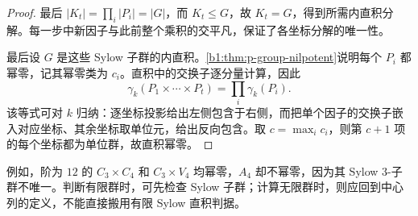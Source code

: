 \begin{proof}
	最后 \(|K_t|=\prod_i|P_i|=|G|\)，而 \(K_t\le G\)，故 \(K_t=G\)，得到所需内直积分解。每一步中新因子与此前整个乘积的交平凡，保证了各坐标分解的唯一性。

	最后设 \(G\) 是这些 Sylow 子群的内直积。\cref{b1:thm:p-group-nilpotent}说明每个 \(P_i\) 都幂零，记其幂零类为 \(c_i\)。直积中的交换子逐分量计算，因此
	\[
		\gamma_k(P_1\times\cdots\times P_t)=\prod_i\gamma_k(P_i).
	\]
	该等式可对 \(k\) 归纳：逐坐标投影给出左侧包含于右侧，而把单个因子的交换子嵌入对应坐标、其余坐标取单位元，给出反向包含。取 \(c=\max_i c_i\)，则第 \(c+1\) 项的每个坐标都为单位群，故直积幂零。
\end{proof}

例如，阶为 \(12\) 的 \(C_3\times C_4\) 和 \(C_3\times V_4\) 均幂零，\(A_4\) 却不幂零，因为其 Sylow \(3\)-子群不唯一。判断有限群时，可先检查 Sylow 子群；计算无限群时，则应回到中心列的定义，不能直接搬用有限 Sylow 直积判据。
